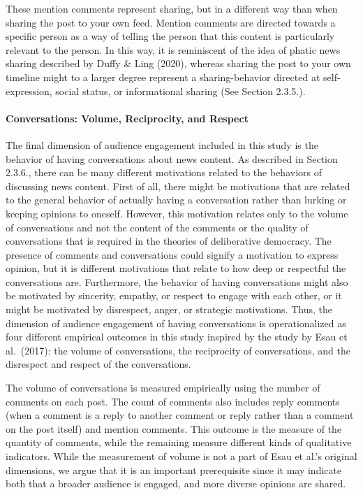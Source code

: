 \documentclass[
]{article}
\begin{document}
\noindent These mention comments represent sharing, but in a different
way than when sharing the post to your own feed. Mention comments are
directed towards a specific person as a way of telling the person that
this content is particularly relevant to the person. In this way, it is
reminiscent of the idea of phatic news sharing described by Duffy \&
Ling (2020), whereas sharing the post to your own timeline might to a
larger degree represent a sharing-behavior directed at self-expression,
social status, or informational sharing (See Section 2.3.5.).

\hypertarget{conversations-volume-reciprocity-and-respect}{%
\paragraph*{Conversations: Volume, Reciprocity, and
Respect}\label{conversations-volume-reciprocity-and-respect}}

\hspace{-2.5em}

\noindent The final dimension of audience engagement included in this
study is the behavior of having conversations about news content. As
described in Section 2.3.6., there can be many different motivations
related to the behaviors of discussing news content. First of all, there
might be motivations that are related to the general behavior of
actually having a conversation rather than lurking or keeping opinions
to oneself. However, this motivation relates only to the volume of
conversations and not the content of the comments or the quality of
conversations that is required in the theories of deliberative
democracy. The presence of comments and conversations could signify a
motivation to express opinion, but it is different motivations that
relate to how deep or respectful the conversations are. Furthermore, the
behavior of having conversations might also be motivated by sincerity,
empathy, or respect to engage with each other, or it might be motivated
by disrespect, anger, or strategic motivations. Thus, the dimension of
audience engagement of having conversations is operationalized as four
different empirical outcomes in this study inspired by the study by Esau
et al.~(2017): the volume of conversations, the reciprocity of
conversations, and the disrespect and respect of the conversations.

The volume of conversations is measured empirically using the number of
comments on each post. The count of comments also includes reply
comments (when a comment is a reply to another comment or reply rather
than a comment on the post itself) and mention comments. This outcome is
the measure of the quantity of comments, while the remaining measure
different kinds of qualitative indicators. While the measurement of
volume is not a part of Esau et al.'s original dimensions, we argue that
it is an important prerequisite since it may indicate both that a
broader audience is engaged, and more diverse opinions are shared.
\end{document}
